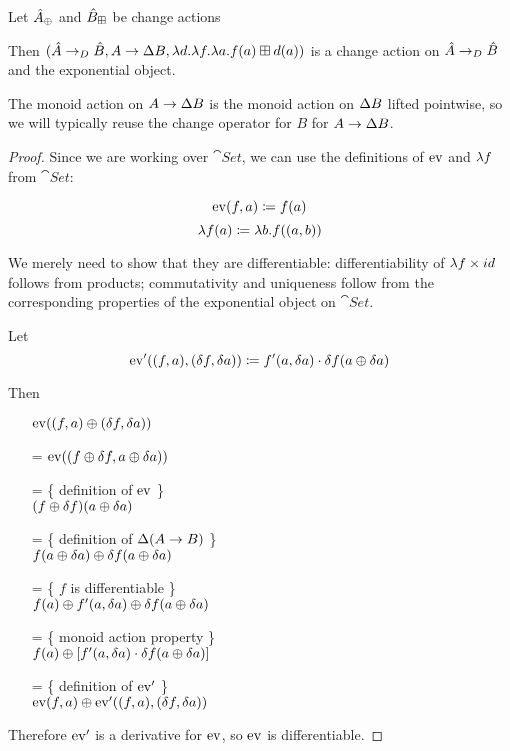 \begin{prop}[Exponentials]
\label{prop:exponentials}
  Let $\hat{A}_\oplus$ and $\hat{B}_\boxplus$ be change actions

  Then $(\hat{A} \rightarrow_{D} \hat{B},A
    \rightarrow \Delta B,\lambda d. \lambda f. \lambda a. f(a) \boxplus
    d(a))$ is a change action on $\hat{A} \rightarrow_{D} \hat{B}$ and the exponential object.

  The monoid action on $A \rightarrow \Delta B$ is the monoid
  action on $\Delta B$ lifted pointwise, so we will typically reuse the
  change operator for $B$ for $A \rightarrow \Delta B$.
\end{prop}
\ifproofs
\begin{proof}
  Since we are working over $\cat{Set}$, we can use the definitions of $\operatorname{ev}$ and
  $\lambda f$ from $\cat{Set}$:

  $$\operatorname{ev}(f, a) \coloneqq f(a)$$
  $$\lambda f(a) \coloneqq \lambda b. f((a, b))$$
  
  We merely need to show that they are differentiable: differentiability of $\lambda f
  \times id$ follows from products; commutativity and
  uniqueness follow from the corresponding properties of the exponential object
  on $\cat{Set}$.

  Let 
  $$\operatorname{ev}'((f, a), (\delta f, \delta a)) \coloneqq f'(a, \delta a) \cdot \delta f(a \oplus \delta a)$$

  Then
  \begin{itemize}
    \item[ ]$\operatorname{ev}((f, a) \oplus (\delta f, \delta a))$
    \item[=]$\operatorname{ev}((f \oplus \delta f, a \oplus \delta a))$
    \item[=]\{ definition of $\operatorname{ev}$ \}\\
      $(f \oplus \delta f)(a \oplus \delta a)$
    \item[=]\{ definition of $\Delta (A \rightarrow B)$ \}\\
      $f(a \oplus \delta a) \oplus \delta f(a \oplus \delta a)$
    \item[=]\{ $f$ is differentiable \}\\
      $f(a) \oplus f'(a, \delta a) \oplus \delta f(a \oplus \delta a)$
    \item[=]\{ monoid action property \}\\
      $f(a) \oplus \left[ f'(a, \delta a) \cdot \delta f(a \oplus \delta a)\right]$
    \item[=]\{ definition of $\operatorname{ev}'$ \}\\
      $\operatorname{ev}(f, a) \oplus \operatorname{ev}'((f, a), (\delta f, \delta a))$
  \end{itemize}
  Therefore $\operatorname{ev}'$ is a derivative for $\operatorname{ev}$, so $\operatorname{ev}$ is differentiable.
  

\end{proof}
